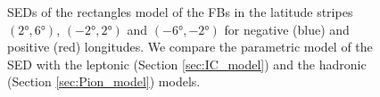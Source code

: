 \begin{figure}[h!]
  	\caption{SEDs of the rectangles model of the FBs in the latitude stripes $(\ang{2}, \ang{6})$, $(\ang{-2}, \ang{2})$ and $(\ang{-6}, \ang{-2})$ for negative (blue) and positive (red) longitudes. We compare the parametric model of the SED with the leptonic (Section \ref{sec:IC_model}) 
	and the hadronic (Section \ref{sec:Pion_model}) models.}
  	\label{fig:SED_with_fits}
\end{figure}

%

